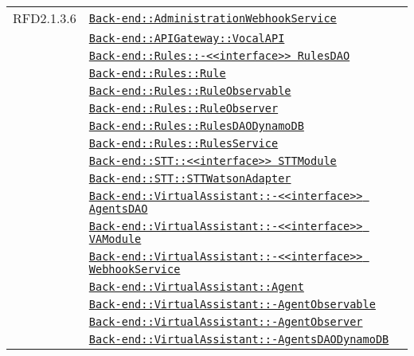 \begin{longtable}{|>{\centering}m{3cm}|m{10cm}<{\centering}|}
RFD2.1.3.6 & \hyperref[Back-end::AdministrationWebhookService]{\texttt{Back-end::AdministrationWebhookService}}\\
& \hyperref[Back-end::APIGateway::VocalAPI]{\texttt{Back-end::APIGateway::VocalAPI}}\\
& \hyperref[Back-end::Rules::<<interface>> RulesDAO]{\texttt{Back-end::Rules::-\linebreak <<interface>> RulesDAO}}\\
& \hyperref[Back-end::Rules::Rule]{\texttt{Back-end::Rules::Rule}}\\
& \hyperref[Back-end::Rules::RuleObservable]{\texttt{Back-end::Rules::RuleObservable}}\\
& \hyperref[Back-end::Rules::RuleObserver]{\texttt{Back-end::Rules::RuleObserver}}\\
& \hyperref[Back-end::Rules::RulesDAODynamoDB]{\texttt{Back-end::Rules::RulesDAODynamoDB}}\\
& \hyperref[Back-end::Rules::RulesService]{\texttt{Back-end::Rules::RulesService}}\\
& \hyperref[Back-end::STT::<<interface>> STTModule]{\texttt{Back-end::STT::<<interface>> STTModule}}\\
& \hyperref[Back-end::STT::STTWatsonAdapter]{\texttt{Back-end::STT::STTWatsonAdapter}}\\
& \hyperref[Back-end::VirtualAssistant::<<interface>> AgentsDAO]{\texttt{Back-end::VirtualAssistant::-\linebreak <<interface>> AgentsDAO}}\\
& \hyperref[Back-end::VirtualAssistant::<<interface>> VAModule]{\texttt{Back-end::VirtualAssistant::-\linebreak <<interface>> VAModule}}\\
& \hyperref[Back-end::VirtualAssistant::<<interface>> WebhookService]{\texttt{Back-end::VirtualAssistant::-\linebreak <<interface>> WebhookService}}\\
& \hyperref[Back-end::VirtualAssistant::Agent]{\texttt{Back-end::VirtualAssistant::Agent}}\\
& \hyperref[Back-end::VirtualAssistant::AgentObservable]{\texttt{Back-end::VirtualAssistant::-\linebreak AgentObservable}}\\
& \hyperref[Back-end::VirtualAssistant::AgentObserver]{\texttt{Back-end::VirtualAssistant::-\linebreak AgentObserver}}\\
& \hyperref[Back-end::VirtualAssistant::AgentsDAODynamoDB]{\texttt{Back-end::VirtualAssistant::-\linebreak AgentsDAODynamoDB}}\\

\end{longtable}
